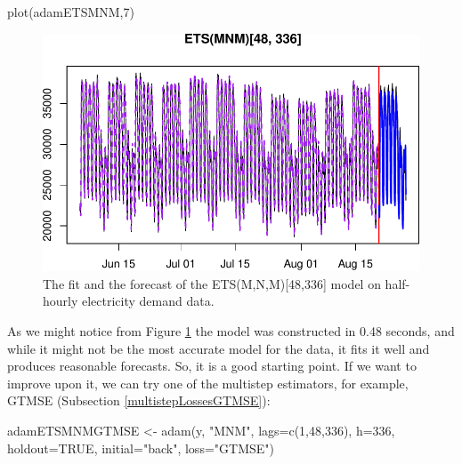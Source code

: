 \documentclass[
]{book}
\newenvironment{Shaded}{\begin{snugshade}}{\end{snugshade}}
\newcommand{\AttributeTok}[1]{\textcolor[rgb]{0.77,0.63,0.00}{#1}}
\newcommand{\ConstantTok}[1]{\textcolor[rgb]{0.00,0.00,0.00}{#1}}
\newcommand{\DecValTok}[1]{\textcolor[rgb]{0.00,0.00,0.81}{#1}}
\newcommand{\FunctionTok}[1]{\textcolor[rgb]{0.00,0.00,0.00}{#1}}
\newcommand{\NormalTok}[1]{#1}
\newcommand{\OtherTok}[1]{\textcolor[rgb]{0.56,0.35,0.01}{#1}}
\newcommand{\StringTok}[1]{\textcolor[rgb]{0.31,0.60,0.02}{#1}}
\theoremstyle{definition}
\theoremstyle{definition}
\theoremstyle{definition}
\theoremstyle{definition}
\theoremstyle{remark}
\begin{document}
\begin{Shaded}
\begin{Highlighting}[]
\FunctionTok{plot}\NormalTok{(adamETSMNM,}\DecValTok{7}\NormalTok{)}
\end{Highlighting}
\end{Shaded}

\begin{figure}
\centering
\includegraphics{Svetunkov--2022----ADAM_files/figure-latex/adamModelETSMNM-1.pdf}
\caption{\label{fig:adamModelETSMNM}The fit and the forecast of the ETS(M,N,M){[}48,336{]} model on half-hourly electricity demand data.}
\end{figure}

As we might notice from Figure \ref{fig:adamModelETSMNM} the model was constructed in 0.48 seconds, and while it might not be the most accurate model for the data, it fits it well and produces reasonable forecasts. So, it is a good starting point. If we want to improve upon it, we can try one of the multistep estimators, for example, GTMSE (Subsection \ref{multistepLossesGTMSE}):

\begin{Shaded}
\begin{Highlighting}[]
\NormalTok{adamETSMNMGTMSE }\OtherTok{\textless{}{-}} \FunctionTok{adam}\NormalTok{(y, }\StringTok{"MNM"}\NormalTok{, }\AttributeTok{lags=}\FunctionTok{c}\NormalTok{(}\DecValTok{1}\NormalTok{,}\DecValTok{48}\NormalTok{,}\DecValTok{336}\NormalTok{),}
                        \AttributeTok{h=}\DecValTok{336}\NormalTok{, }\AttributeTok{holdout=}\ConstantTok{TRUE}\NormalTok{,}
                        \AttributeTok{initial=}\StringTok{"back"}\NormalTok{, }\AttributeTok{loss=}\StringTok{"GTMSE"}\NormalTok{)}
\end{Highlighting}
\end{Shaded}
\end{document}
